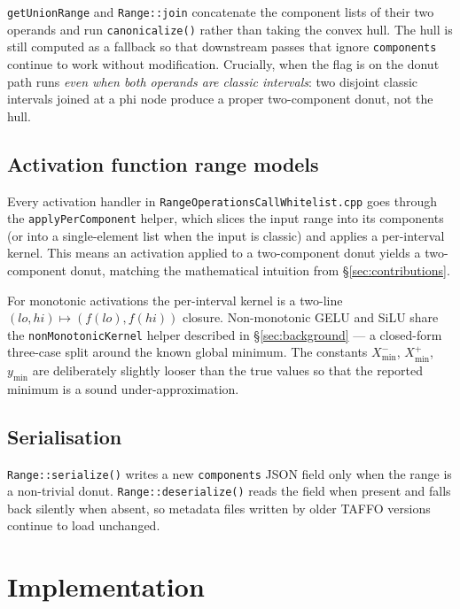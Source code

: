 \documentclass[11pt,a4paper]{article}
\theoremstyle{plain}
\begin{document}
\texttt{getUnionRange} and \texttt{Range::join} concatenate the
component lists of their two operands and run \texttt{canonicalize()}
rather than taking the convex hull. The hull is still computed as a
fallback so that downstream passes that ignore \texttt{components}
continue to work without modification. Crucially, when the flag is on
the donut path runs \emph{even when both operands are classic
intervals}: two disjoint classic intervals joined at a phi node
produce a proper two-component donut, not the hull.

\subsection{Activation function range models}

Every activation handler in \texttt{RangeOperationsCallWhitelist.cpp}
goes through the \texttt{applyPerComponent} helper, which slices the
input range into its components (or into a single-element list when
the input is classic) and applies a per-interval kernel. This means
an activation applied to a two-component donut yields a two-component
donut, matching the mathematical intuition from \S\ref{sec:contributions}.

For monotonic activations the per-interval kernel is a two-line
$(lo, hi)\mapsto(f(lo), f(hi))$ closure. Non-monotonic GELU and SiLU
share the \texttt{nonMonotonicKernel} helper described in \S\ref{sec:background}
--- a closed-form three-case split around the known global minimum.
The constants $X^-_{\min}$, $X^+_{\min}$, $y_{\min}$ are deliberately
slightly looser than the true values so that the reported minimum is
a sound under-approximation.

\subsection{Serialisation}

\texttt{Range::serialize()} writes a new \texttt{components} JSON field
only when the range is a non-trivial donut. \texttt{Range::deserialize()}
reads the field when present and falls back silently when absent, so
metadata files written by older TAFFO versions continue to load
unchanged.

\section{Implementation}
\label{sec:impl}
\end{document}
